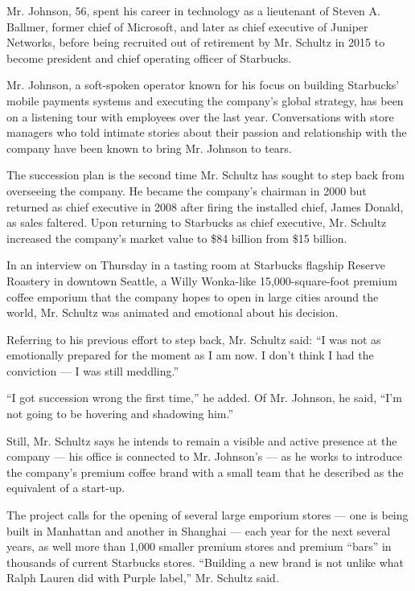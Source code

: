 Mr. Johnson, 56, spent his career in technology as a lieutenant of
Steven A. Ballmer, former chief of Microsoft, and later as chief
executive of Juniper Networks, before being recruited out of retirement
by Mr. Schultz in 2015 to become president and chief operating officer
of Starbucks.

Mr. Johnson, a soft-spoken operator known for his focus on building
Starbucks' mobile payments systems and executing the company's global
strategy, has been on a listening tour with employees over the last
year. Conversations with store managers who told intimate stories about
their passion and relationship with the company have been known to bring
Mr. Johnson to tears.

The succession plan is the second time Mr. Schultz has sought to step
back from overseeing the company. He became the company's chairman in
2000 but returned as chief executive in 2008 after firing the installed
chief, James Donald, as sales faltered. Upon returning to Starbucks as
chief executive, Mr. Schultz increased the company's market value to
\$84 billion from \$15 billion.

In an interview on Thursday in a tasting room at Starbucks flagship
Reserve Roastery in downtown Seattle, a Willy Wonka-like
15,000-square-foot premium coffee emporium that the company hopes to
open in large cities around the world, Mr. Schultz was animated and
emotional about his decision.

Referring to his previous effort to step back, Mr. Schultz said: ``I was
not as emotionally prepared for the moment as I am now. I don't think I
had the conviction --- I was still meddling.''

``I got succession wrong the first time,'' he added. Of Mr. Johnson, he
said, ``I'm not going to be hovering and shadowing him.''

Still, Mr. Schultz says he intends to remain a visible and active
presence at the company --- his office is connected to Mr. Johnson's ---
as he works to introduce the company's premium coffee brand with a small
team that he described as the equivalent of a start-up.

The project calls for the opening of several large emporium stores ---
one is being built in Manhattan and another in Shanghai --- each year
for the next several years, as well more than 1,000 smaller premium
stores and premium ``bars'' in thousands of current Starbucks stores.
``Building a new brand is not unlike what Ralph Lauren did with Purple
label,'' Mr. Schultz said.

